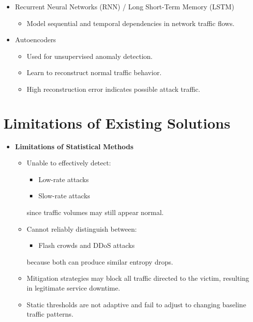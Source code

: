 \documentclass[12pt,a4paper]{article}
\begin{document}
\begin{itemize}
\begin{itemize}
\begin{itemize}
\begin{itemize}
      \end{itemize}
      \item Recurrent Neural Networks (RNN) / Long Short-Term Memory (LSTM)
      \begin{itemize}
        \item Model sequential and temporal dependencies in network traffic
        flows.
      \end{itemize}
      \item Autoencoders
      \begin{itemize}
        \item Used for unsupervised anomaly detection.
        \item Learn to reconstruct normal traffic behavior.
        \item High reconstruction error indicates possible attack traffic.
      \end{itemize}
    \end{itemize}
  \end{itemize}
\end{itemize}

\newpage
\section{Limitations of Existing Solutions}
\begin{itemize}
  \item \textbf{Limitations of Statistical Methods}
  \begin{itemize}
    \item Unable to effectively detect:
    \begin{itemize}
      \item Low-rate attacks
      \item Slow-rate attacks
    \end{itemize}
    since traffic volumes may still appear normal.
    \item Cannot reliably distinguish between:
    \begin{itemize}
      \item Flash crowds and DDoS attacks
    \end{itemize}
    because both can produce similar entropy drops.
    \item Mitigation strategies may block all traffic directed to the victim,
    resulting in legitimate service downtime.
    \item Static thresholds are not adaptive and fail to adjust to changing
    baseline traffic patterns.
  \end{itemize}
\end{itemize}
\end{document}
